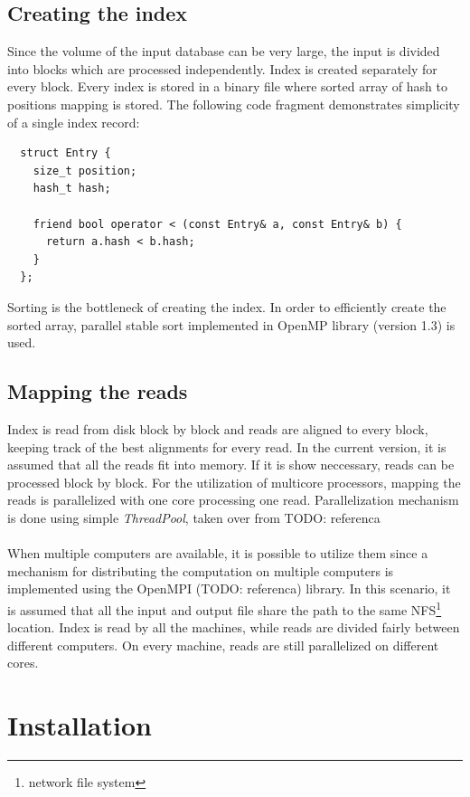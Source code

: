 \documentclass[times, utf8, diplomski]{fer}
\begin{document}
\subsection{Creating the index}
Since the volume of the input database can be very large, the input is divided into blocks which are processed independently. Index is created separately for every block. Every index is stored in a binary file where sorted array of hash to positions mapping is stored. The following code fragment demonstrates simplicity of a single index record:
\begin{lstlisting}
  struct Entry {
    size_t position;
    hash_t hash;

    friend bool operator < (const Entry& a, const Entry& b) {
      return a.hash < b.hash;
    }
  };
\end{lstlisting}

Sorting is the bottleneck of creating the index. In order to efficiently create the sorted array, parallel stable sort implemented in OpenMP library (version 1.3) is used. 

\subsection{Mapping the reads}

Index is read from disk block by block and reads are aligned to every block, keeping track of the best alignments for every read. In the current version, it is assumed that all the reads fit into memory. If it is show neccessary, reads can be processed block by block. For the utilization of multicore processors, mapping the reads is parallelized with one core processing one read. Parallelization mechanism is done using simple \emph{ThreadPool}, taken over from TODO: referenca\\
\\
When multiple computers are available, it is possible to utilize them since a mechanism for distributing the computation on multiple computers is implemented using the OpenMPI (TODO: referenca) library. In this scenario, it is assumed that all the input and output file share the path to the same NFS\footnote{network file system} location. Index is read by all the machines, while reads are divided fairly between different computers. On every machine, reads are still parallelized on different cores.

\section{Installation}
\end{document}

